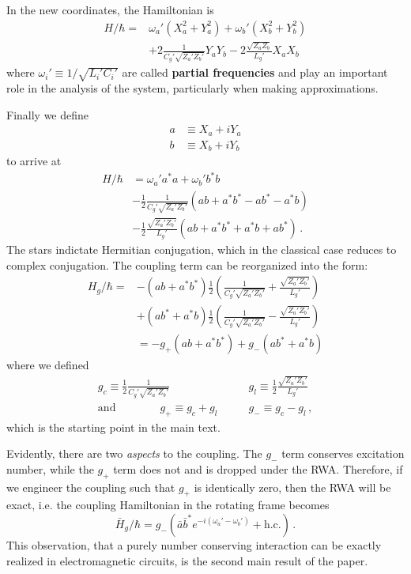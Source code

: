 In the new coordinates, the Hamiltonian is
\begin{align}
  H / \hbar
  =& \omega_a' \left(X_a^2 + Y_a^2 \right)
  +  \omega_b' \left(X_b^2 + Y_b^2 \right) \nonumber \\
  &+ 2 \frac{1}{C_g' \sqrt{Z_a' Z_b'}} Y_a Y_b
   - 2 \frac{\sqrt{Z_a Z_b}}{L_g'} X_a X_b
\end{align}
where $\omega_i' \equiv 1 / \sqrt{L_i' C_i'}$ are called \textbf{partial frequencies} and play an important role in the analysis of the system, particularly when making approximations.


Finally we define
\begin{align}
  a &\equiv X_a + i Y_a \nonumber \\
  b &\equiv X_b + i Y_b
\end{align}
to arrive at
\begin{align}
  H / \hbar
  &= \omega_a' a^* a + \omega_b' b^* b \nonumber \\
  & - \frac{1}{2} \frac{1}{C_g' \sqrt{Z_a' Z_b'}} (ab + a^* b^* - a b^* - a^* b) \nonumber \\
  &- \frac{1}{2} \frac{\sqrt{Z_a' Z_b'}}{L_g'} (ab + a^* b^* + a^* b + a b^*)
  \, .
\end{align}
The stars indictate Hermitian conjugation, which in the classical case reduces to complex conjugation.
The coupling term can be reorganized into the form:
\begin{align}
  H_g / \hbar =
  &- \left( a b + a^* b^* \right)
    \frac{1}{2} \left(
      \frac{1}{C_g' \sqrt{Z_a' Z_b'}} + \frac{\sqrt{Z_a' Z_b'}}{L_g'}
    \right) \nonumber \\
  &+ \left( a b^* + a^* b \right)
    \frac{1}{2} \left(
      \frac{1}{C_g' \sqrt{Z_a' Z_b'}} - \frac{\sqrt{Z_a' Z_b'}}{L_g'}
    \right) \nonumber \\
  &= -g_+ (ab + a^* b^*) + g_- (ab^* + a^* b)
\end{align}
where we defined
\begin{align}
  g_c \equiv \frac{1}{2} \frac{1}{C_g' \sqrt{Z_a' Z_b'}} &\qquad
  g_l \equiv \frac{1}{2} \frac{\sqrt{Z_a' Z_b'}}{L_g'} \nonumber \\
  \text{and} \qquad \qquad
  g_+ \equiv g_c + g_l &\qquad g_- \equiv g_c - g_l
  \, ,
\end{align}
which is the starting point in the main text.


Evidently, there are two \emph{aspects} to the coupling.
The $g_-$ term conserves excitation number, while the $g_+$ term does not and is dropped under the RWA.
Therefore, if we engineer the coupling such that $g_+$ is identically zero, then the RWA will be exact, i.e. the coupling Hamiltonian in the rotating frame becomes
\begin{equation}
  \bar{H}_g / \hbar = g_- \left( \bar{a} \bar{b}^* e^{-i (\omega_a' - \omega_b')}+ \text{h.c.} \right)
  \, .
\end{equation}
This observation, that a purely number conserving interaction can be exactly realized in electromagnetic circuits, is the second main result of the paper.

